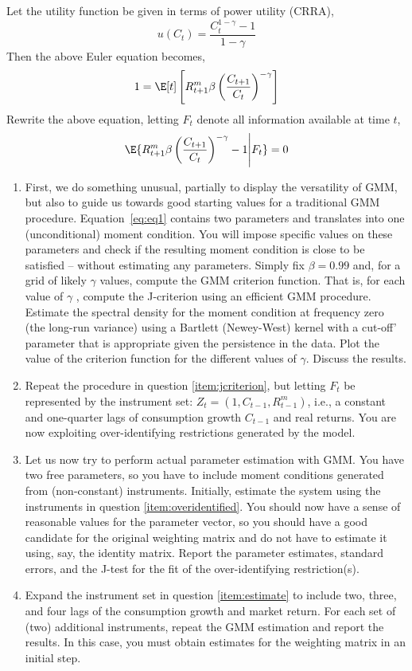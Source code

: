 Let the utility function be given in terms of power utility (CRRA),
\[
    u(C_t) = \frac{C_t^{1-\gamma}-1}{1-\gamma}    
\]
Then the above Euler equation becomes,
\[
    1 = \E[t]\left[R^m_{t+1}\beta\left(\frac{C_{t+1}}{C_t}\right)^{-\gamma}\right]
\]
Rewrite the above equation, letting \(F_t\) denote all information available at time \(t\),
\begin{equation}
    \label{eq:eq1}
    \E{R^m_{t+1}\beta\left(\frac{C_{t+1}}{C_t}\right)^{-\gamma}-1 \Bigg\vert F_t} = 0
\end{equation}
\begin{enumerate}[label = \Alph*)]
    \item\label{item:jcriterion} First, we do something unusual, partially to display the versatility of GMM, but also to guide us towards good starting values for a traditional GMM procedure. Equation~\ref{eq:eq1} contains two parameters and translates into one (unconditional) moment condition. You will impose speciﬁc values on these parameters and check if the resulting moment condition is close to be satisﬁed – without estimating any parameters. Simply ﬁx \(\beta = 0.99\) and, for a grid of likely \(\gamma\) values, compute the GMM criterion function. That is, for each value of \(\gamma\) , compute the J-criterion using an eﬃcient GMM procedure. Estimate the spectral density for the moment condition at frequency zero (the long-run variance) using a Bartlett (Newey-West) kernel with a cut-off' parameter that is appropriate given the persistence in the data. Plot the value of the criterion function for the diﬀerent values of \(\gamma\). Discuss the results.
    \item\label{item:overidentified} Repeat the procedure in question \ref{item:jcriterion}, but letting \(F_t\) be represented by the instrument set: \(Z_t = \left(1, C_{t-1}, R^m_{t-1}\right)\), i.e., a constant and one-quarter lags of consumption growth \(C_{t-1}\)  and real returns. You are now exploiting over-identifying restrictions generated by the model.
    \item\label{item:estimate} Let us now try to perform actual parameter estimation with GMM. You have two free parameters, so you have to include moment conditions generated from (non-constant) instruments. Initially, estimate the system using the instruments in question \ref{item:overidentified}. You should now have a sense of reasonable values for the parameter vector, so you should have a good candidate for the original weighting matrix and do not have to estimate it using, say, the identity matrix. Report the parameter estimates, standard errors, and the J-test for the ﬁt of the over-identifying restriction(s).
    \item Expand the instrument set in question \ref{item:estimate} to include two, three, and four lags of the consumption growth and market return. For each set of (two) additional instruments, repeat the GMM estimation and report the results. In this case, you must obtain estimates for the weighting matrix in an initial step.
\end{enumerate}
